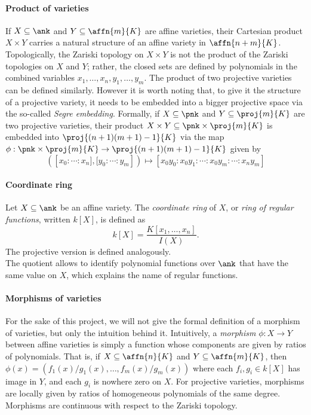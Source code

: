 \paragraph{Product of varieties}
If $X \subseteq \ank$ and $Y \subseteq \affn{m}{K}$ are affine varieties, their Cartesian product $X \times Y$ carries a natural structure of an affine variety in $\affn{n+m}{K}$. Topologically, the Zariski topology on $X \times Y$ is not the product of the Zariski topologies on $X$ and $Y$; rather, the closed sets are defined by polynomials in the combined variables $x_1, \ldots, x_n, y_1, \ldots, y_m$. The product of two projective varieties can be defined similarly. However it is worth noting that, to give it the structure of a projective variety, it needs to be embedded into a bigger projective space via the so-called \emph{Segre embedding}. Formally, if $X \subseteq \pnk$ and $Y \subseteq \proj{m}{K}$ are two projective varieties, their product $X \times Y \subseteq \pnk \times \proj{m}{K}$ is embedded into $\proj{(n+1)(m+1) - 1}{K}$ via the map $\phi: \pnk \times \proj{m}{K} \rightarrow \proj{(n+1)(m+1) - 1}{K}$ given by 
\[\left(\left[x_0: \cdots: x_n], [y_0: \cdots:y_m\right]\right) \mapsto \left[x_0 y_0: x_0 y_1: \cdots: x_0 y_m: \cdots: x_n y_m\right]\]

\paragraph{Coordinate ring}
Let $X \subseteq \ank$ be an affine variety. The \emph{coordinate ring} of $X$, or \emph{ring of regular functions}, written $k[X]$, is defined as
\[k[X] = \frac{K[x_1, \ldots, x_n]}{I(X)}.\]
The projective version is defined analogously.\\
The quotient allows to identify polynomial functions over $\ank$ that have the same value on $X$, which explains the name of regular functions.

\paragraph{Morphisms of varieties}
For the sake of this project, we will not give the formal definition of a morphism of varieties, but only the intuition behind it. Intuitively, a \emph{morphism} $\phi: X \to Y$ between affine varieties is simply a function whose components are given by ratios of polynomials. That is, if $X \subseteq \affn{n}{K}$ and $Y \subseteq \affn{m}{K}$, then $\phi(x) = (f_1(x)/g_1(x), \ldots, f_m(x)/g_m(x))$ where each $f_i, g_i \in k[X]$ has image in $Y$, and each $g_i$ is nowhere zero on $X$. For projective varieties, morphisms are locally given by ratios of homogeneous polynomials of the same degree. Morphisms are continuous with respect to the Zariski topology.

